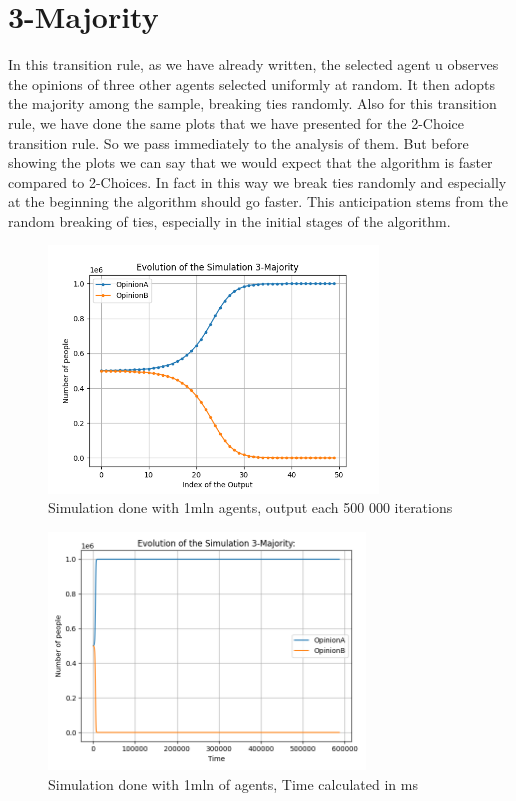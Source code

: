 \section{3-Majority}
\label{3Majority}
In this transition rule, as we have already written, the selected agent u observes the opinions of three other agents selected uniformly at random. It then adopts the majority among the sample, breaking ties randomly.
Also for this transition rule, we have done the same plots that we have presented for the 2-Choice transition rule. So we pass immediately to the analysis of them.
But before showing the plots we can say that we would expect that the algorithm is faster compared to 2-Choices. In fact in this way we break ties randomly and especially at the beginning the algorithm should go faster. This anticipation stems from the random breaking of ties, especially in the initial stages of the algorithm.

\begin{figure}[H]
     \centering
     \includegraphics[width=0.78\textwidth,height=0.32\textheight]{img/svg/3_Majority/1mln/withoutTime.png}
     \caption{Simulation done with 1mln agents, output each 500 000 iterations}
\end{figure}
\begin{figure}[H]
     \centering
     \includegraphics[width=0.75\textwidth,height=0.32\textheight]{img/svg/3_Majority/1mln/withTime.png}
     \caption{Simulation done with 1mln of agents, Time calculated in ms}
\end{figure}

